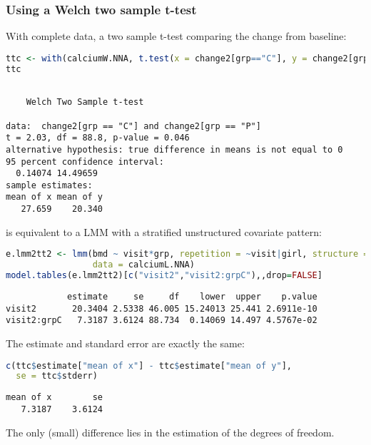 \documentclass[12pt]{article}
\begin{document}
\subsubsection{Using a Welch two sample t-test}
\label{sec:org5d0ef5a}

With complete data, a two sample t-test comparing the change from baseline:
\begin{lstlisting}[language=r,numbers=none]
ttc <- with(calciumW.NNA, t.test(x = change2[grp=="C"], y = change2[grp=="P"]))
ttc
\end{lstlisting}

\label{}
\begin{verbatim}

	Welch Two Sample t-test

data:  change2[grp == "C"] and change2[grp == "P"]
t = 2.03, df = 88.8, p-value = 0.046
alternative hypothesis: true difference in means is not equal to 0
95 percent confidence interval:
  0.14074 14.49659
sample estimates:
mean of x mean of y 
   27.659    20.340
\end{verbatim}

is equivalent to a LMM with a stratified unstructured covariate pattern:
\begin{lstlisting}[language=r,numbers=none]
e.lmm2tt2 <- lmm(bmd ~ visit*grp, repetition = ~visit|girl, structure = UN(~grp),
                 data = calciumL.NNA)
model.tables(e.lmm2tt2)[c("visit2","visit2:grpC"),,drop=FALSE]
\end{lstlisting}

\label{}
\begin{verbatim}
            estimate     se     df    lower  upper    p.value
visit2       20.3404 2.5338 46.005 15.24013 25.441 2.6911e-10
visit2:grpC   7.3187 3.6124 88.734  0.14069 14.497 4.5767e-02
\end{verbatim}


The estimate and standard error are exactly the same:
\begin{lstlisting}[language=r,numbers=none]
c(ttc$estimate["mean of x"] - ttc$estimate["mean of y"],
  se = ttc$stderr)
\end{lstlisting}

\label{}
\begin{verbatim}
mean of x        se 
   7.3187    3.6124
\end{verbatim}


The only (small) difference lies in the estimation of the degrees of freedom.
\end{document}
